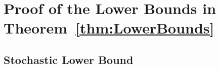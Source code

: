 
\section{Proof of the Lower Bounds in Theorem~\ref{thm:LowerBounds}}
\label{sec:lowerboundproofs}
\subsection{Stochastic Lower Bound}

